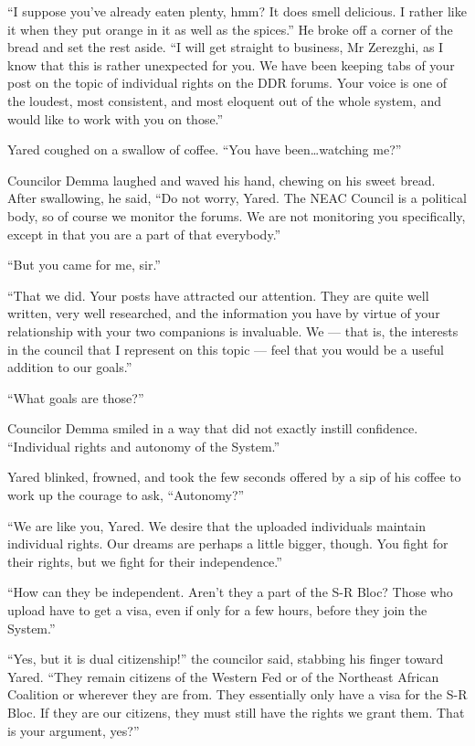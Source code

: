 ``I suppose you've already eaten plenty, hmm? It does smell delicious. I rather like it when they put orange in it as well as the spices.'' He broke off a corner of the bread and set the rest aside. ``I will get straight to business, Mr Zerezghi, as I know that this is rather unexpected for you. We have been keeping tabs of your post on the topic of individual rights on the DDR forums. Your voice is one of the loudest, most consistent, and most eloquent out of the whole system, and would like to work with you on those.''

Yared coughed on a swallow of coffee. ``You have been\ldots watching me?''

Councilor Demma laughed and waved his hand, chewing on his sweet bread. After swallowing, he said, ``Do not worry, Yared. The NEAC Council is a political body, so of course we monitor the forums. We are not monitoring you specifically, except in that you are a part of that everybody.''

``But you came for me, sir.''

``That we did. Your posts have attracted our attention. They are quite well written, very well researched, and the information you have by virtue of your relationship with your two companions is invaluable. We — that is, the interests in the council that I represent on this topic — feel that you would be a useful addition to our goals.''

``What goals are those?''

Councilor Demma smiled in a way that did not exactly instill confidence. ``Individual rights and autonomy of the System.''

Yared blinked, frowned, and took the few seconds offered by a sip of his coffee to work up the courage to ask, ``Autonomy?''

``We are like you, Yared. We desire that the uploaded individuals maintain individual rights. Our dreams are perhaps a little bigger, though. You fight for their rights, but we fight for their independence.''

``How can they be independent. Aren't they a part of the S-R Bloc? Those who upload have to get a visa, even if only for a few hours, before they join the System.''

``Yes, but it is dual citizenship!'' the councilor said, stabbing his finger toward Yared. ``They remain citizens of the Western Fed or of the Northeast African Coalition or wherever they are from. They essentially only have a visa for the S-R Bloc. If they are our citizens, they must still have the rights we grant them. That is your argument, yes?''

